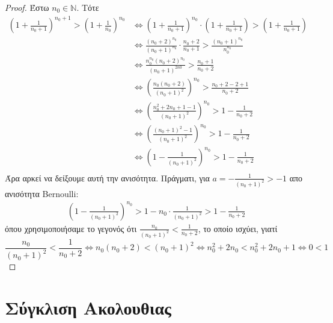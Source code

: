 \documentclass[main.tex]{subfiles}
\begin{document}
\begin{proof}
\item {}
    Έστω $ n_{0} \in \mathbb{N} $. Τότε 
    \begin{align*}
        \left(1+ \frac{1}{n_{0}+1} \right)^{n_{0}+1} > 
        \left(1+ \frac{1}{n_{0}} \right)^{n_{0}} 
        &\Leftrightarrow \left(1+ \frac{1}{n_{0}+1} \right)^{n_{0}} 
        \cdot \left(1 + \frac{1}{n_{0} +1} \right) > \left(1+ \frac{1}{n_{0}+1} 
        \right) \\
        & \Leftrightarrow \frac{(n_{0}+2)^{n_{0}}}{(n_{0}+1)^{n_{0}}} \cdot 
        \frac{n_{0}+2}{n_{0}+1} > \frac{(n_{0}+1)^{n_{0}}}{n_{0}^{n_{0}}} \\
        & \Leftrightarrow \frac{n_{0}^{n_{0}}(n_{0}+2)^{n_{0}}}{(n_{0}+1)^{2n0}} > 
        \frac{n_{0}+1}{n_{0}+2} \\
        & \Leftrightarrow \left(\frac{n_{0}(n_{0}+2)}{(n_{0}+1)^{2}}\right)^{n_{0}} > 
        \frac{n_{0}+2-2+1}{n_{0}+2} \\
        & \Leftrightarrow \left(\frac{n_{0}^{2}+2 n_{0}+1-1}{(n_{0}+1)^{2}}\right)
        ^{n_{0}} > 1-\frac{1}{n_{0}+2} \\
        & \Leftrightarrow \left(\frac{(n_{0}+1)^{2}-1}{(n_{0}+1)^{2}} \right)^{n_{0}}
        > 1 - \frac{1}{n_{0}+2} \\
        & \Leftrightarrow \left(1 - \frac{1}{(n_{0}+1)^{2}} \right)^{n_{0} } > 1 - 
        \frac{1}{n_{0}+2} \\
    \end{align*} 
    Άρα αρκεί να δείξουμε αυτή την ανισότητα. Πράγματι,
    για $ a = - \frac{1}{(n_{0}+1)^{2}} > -1 $ απο ανισότητα Bernoulli: 
    \begin{align*}
        \left(1- \frac{1}{(n_{0}+1)^{2}}\right)^{n_{0}} > 1 - n_{0}\cdot 
        \frac{1}{(n_{0}+1)^{2}} > 1 - \frac{1}{n_{0}+2} 
    \end{align*}
    όπου χρησιμοποιήσαμε το γεγονός ότι $ \frac{n_{0}}{(n_{0}+1)^{2}} < 
    \frac{1}{n_{0}+2}  $, το οποίο ισχύει, γιατί 
    \[
        \frac{n_{0}}{(n_{0}+1)^{2}} < \frac{1}{n_{0}+2} 
        \Leftrightarrow n_{0}(n_{0}+2) < (n_{0}+1)^{2} 
        \Leftrightarrow n_{0}^{2}+2 n_{0} < n_{0}^{2} + 2 n_{0}+1 
        \Leftrightarrow 0 < 1
    \]
\end{proof}

\section{Σύγκλιση Ακολουθιας}
\end{document}

